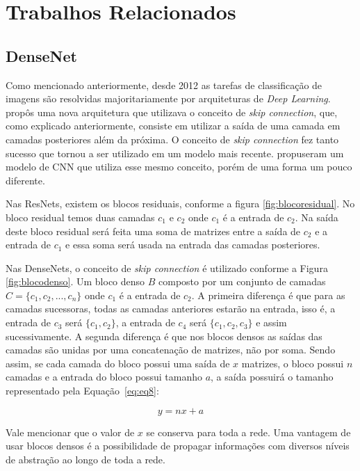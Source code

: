 \chapter{Trabalhos Relacionados}
\label{cap:3}
\vspace{-1.9cm}

\section{DenseNet}
\label{secao:3:1}

Como mencionado anteriormente, desde 2012 as tarefas de classificação de imagens são resolvidas majoritariamente por arquiteturas de \textit{Deep Learning}.  propôs uma nova arquitetura que utilizava o conceito de \textit{skip connection}, que, como explicado anteriormente, consiste em utilizar a saída de uma camada em camadas posteriores além da próxima. O conceito de \textit{skip connection} fez tanto sucesso que tornou a ser utilizado em um modelo mais recente. \cite{liu-2017} propuseram um modelo de \ac{CNN} que utiliza esse mesmo conceito, porém de uma forma um pouco diferente. 

Nas \ac{ResNet}s, existem os blocos residuais, conforme a figura \ref{fig:blocoresidual}. No bloco residual temos duas camadas $c_1$ e $c_2$ onde $c_1$ é a entrada de $c_2$. Na saída deste bloco residual será feita uma soma de matrizes entre a saída de $c_2$ e a entrada de $c_1$ e essa soma será usada na entrada das camadas posteriores. 

Nas \ac{DenseNet}s, o conceito de \textit{skip connection} é utilizado conforme a Figura \ref{fig:blocodenso}. Um bloco denso $B$ composto por um conjunto de camadas $C = \{c_1, c_2, ..., c_n\}$ onde $c_1$ é a entrada de $c_2$. A primeira diferença é que para as camadas sucessoras, todas as camadas anteriores estarão na entrada, isso é, a entrada de $c_3$ será $\{c_1, c_2\}$, a entrada de $c_4$ será $\{c_1, c_2,c_3\}$ e assim sucessivamente. A segunda diferença é que nos blocos densos as saídas das camadas são unidas por uma concatenação de matrizes, não por soma. Sendo assim, se cada camada do bloco possui uma saída de $x$ matrizes, o bloco possui $n$ camadas e a entrada do bloco possui tamanho $a$, a saída possuirá o tamanho representado pela Equação~\ref{eq:eq8}:

\begin{equation}
	\label{eq:eq8}	y = n x + a
\end{equation}

Vale mencionar que o valor de $x$ se conserva para toda a rede. Uma vantagem de usar blocos densos é a possibilidade de propagar informações com diversos níveis de abstração ao longo de toda a rede.

